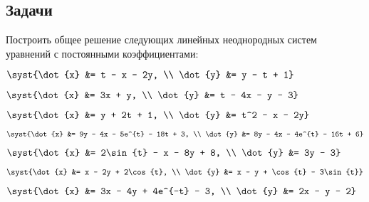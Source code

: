 \subsection{Задачи}

	Построить общее решение следующих линейных неоднородных систем уравнений с постоянными коэффициентами:
	\begin{multicols}{2}
		\begin{enumtasks}


			\label{linsys_nonhmg:quasipolys}
			\item \( \syst{\dot{x} &= t - x - 2y, \\ \dot{y} &= y - t + 1} \) %
			\item \( \syst{\dot{x} &= 3x + y, \\ \dot{y} &= t - 4x - y - 3} \) %
			\item \( \syst{\dot{x} &= y + 2t + 1, \\ \dot{y} &= t^2 - x - 2y} \) %
			\item \( \syst{\dot{x} &= 9y - 4x - 5e^{t} - 18t + 3, \\ \dot{y} &= 8y - 4x - 4e^{t} - 16t + 6} \) %
			\item \( \syst{\dot{x} &= 2\sin{t} - x - 8y + 8, \\ \dot{y} &= 3y - 3} \) %
			\item \( \syst{\dot{x} &= x - 2y + 2\cos{t}, \\ \dot{y} &= x - y + \cos{t} - 3\sin{t}} \) %
			\item \( \syst{\dot{x} &= 3x - 4y + 4e^{-t} - 3, \\ \dot{y} &= 2x - y - 2} \) %

\end{enumtasks}
\end{multicols}

